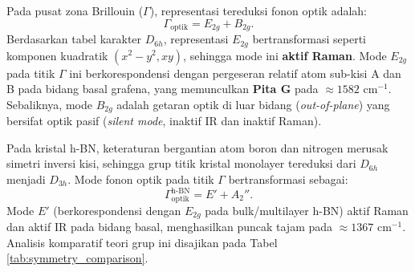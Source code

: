 Pada pusat zona Brillouin ($\Gamma$), representasi tereduksi fonon optik adalah:
\begin{equation}
\Gamma_{\text{optik}} = E_{2g} + B_{2g}.
\label{eq:fonon_grafena}
\end{equation}
Berdasarkan tabel karakter $D_{6h}$, representasi $E_{2g}$ bertransformasi seperti komponen kuadratik $(x^2 - y^2, xy)$, sehingga mode ini \textbf{aktif Raman}. Mode $E_{2g}$ pada titik $\Gamma$ ini berkorespondensi dengan pergeseran relatif atom sub-kisi A dan B pada bidang basal grafena, yang memunculkan \textbf{Pita G} pada $\approx 1582\text{ cm}^{-1}$. Sebaliknya, mode $B_{2g}$ adalah getaran optik di luar bidang (\textit{out-of-plane}) yang bersifat optik pasif (\textit{silent mode}, inaktif IR dan inaktif Raman).

Pada kristal h-BN, keteraturan bergantian atom boron dan nitrogen merusak simetri inversi kisi, sehingga grup titik kristal monolayer tereduksi dari $D_{6h}$ menjadi $D_{3h}$. Mode fonon optik pada titik $\Gamma$ bertransformasi sebagai:
\begin{equation}
\Gamma_{\text{optik}}^{\text{h-BN}} = E' + A_2''.
\end{equation}
Mode $E'$ (berkorespondensi dengan $E_{2g}$ pada bulk/multilayer h-BN) aktif Raman dan aktif IR pada bidang basal, menghasilkan puncak tajam pada $\approx 1367\text{ cm}^{-1}$. Analisis komparatif teori grup ini disajikan pada Tabel \ref{tab:symmetry_comparison}.

\begin{table}[htbp]
\centering
\caption{Klasifikasi Teori Grup dan Keaktifan Raman pada Material Acuan.}
\label{tab:symmetry_comparison}
\end{table}
